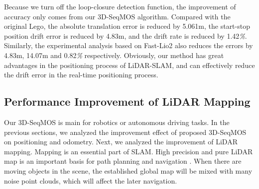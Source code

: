 \documentclass[lettersize,journal]{IEEEtran}
\begin{document}
Because we turn off the loop-closure detection function, the improvement of accuracy only comes from our 3D-SeqMOS algorithm. Compared with the original Lego, the absolute translation error is reduced by 5.061m, the start-stop position drift error is reduced by 4.83m, and the drift rate is reduced by 1.42\emph{\%}. Similarly, the experimental analysis based on Fast-Lio2 also reduces the errors by 4.83m, 14.07m and 0.82\emph{\%} respectively. Obviously, our method has great advantages in the positioning process of LiDAR-SLAM, and can effectively reduce the drift error in the real-time positioning process.

\subsection{Performance Improvement of LiDAR Mapping}
Our 3D-SeqMOS is main for robotics or autonomous driving tasks. In the previous sections, we analyzed the improvement effect of proposed 3D-SeqMOS on positioning and odometry. Next, we analyzed the improvement of LiDAR mapping. Mapping is an essential part of SLAM. High precision and pure LiDAR map is an important basis for path planning and navigation \cite{ravi2019lane}. When there are moving objects in the scene, the established global map will be mixed with many noise point clouds, which will affect the later navigation.
\end{document}
